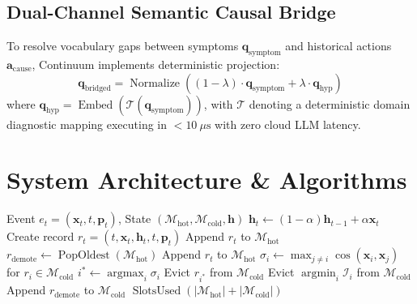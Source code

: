 \documentclass[10pt,journal,compsoc]{IEEEtran}
\begin{document}
\subsection{Dual-Channel Semantic Causal Bridge}
To resolve vocabulary gaps between symptoms $\mathbf{q}_{\text{symptom}}$ and historical actions $\mathbf{a}_{\text{cause}}$, Continuum implements deterministic projection:
\begin{equation}
\mathbf{q}_{\text{bridged}} = \operatorname{Normalize}\left((1 - \lambda) \cdot \mathbf{q}_{\text{symptom}} + \lambda \cdot \mathbf{q}_{\text{hyp}}\right)
\end{equation}
where $\mathbf{q}_{\text{hyp}} = \operatorname{Embed}(\mathcal{T}(\mathbf{q}_{\text{symptom}}))$, with $\mathcal{T}$ denoting a deterministic domain diagnostic mapping executing in $< 10\ \mu\text{s}$ with zero cloud LLM latency.

\section{System Architecture \& Algorithms}

\begin{algorithm}[t]
\caption{Continuous Stream Ingestion with Subspace Diversity Pruning}
\begin{algorithmic}[1]
\REQUIRE Event $e_t = (\mathbf{x}_t, t, \mathbf{p}_t)$, State $(\mathcal{M}_{\text{hot}}, \mathcal{M}_{\text{cold}}, \mathbf{h})$
\STATE $\mathbf{h}_t \leftarrow (1 - \alpha)\mathbf{h}_{t-1} + \alpha \mathbf{x}_t$
\STATE Create record $r_t = (t, \mathbf{x}_t, \mathbf{h}_t, t, \mathbf{p}_t)$
    \STATE Append $r_t$ to $\mathcal{M}_{\text{hot}}$
\ELSE
    \STATE $r_{\text{demote}} \leftarrow \operatorname{PopOldest}(\mathcal{M}_{\text{hot}})$
    \STATE Append $r_t$ to $\mathcal{M}_{\text{hot}}$
        \STATE $\sigma_i \leftarrow \max_{j \ne i} \cos(\mathbf{x}_i, \mathbf{x}_j)$ for $r_i \in \mathcal{M}_{\text{cold}}$
        \STATE $i^* \leftarrow \operatorname{argmax}_i \sigma_i$
            \STATE Evict $r_{i^*}$ from $\mathcal{M}_{\text{cold}}$ 
        \ELSE
            \STATE Evict $\operatorname{argmin}_i \mathcal{I}_i$ from $\mathcal{M}_{\text{cold}}$
        \ENDIF
    \ENDIF
    \STATE Append $r_{\text{demote}}$ to $\mathcal{M}_{\text{cold}}$
\ENDIF
\RETURN $\operatorname{SlotsUsed}(|\mathcal{M}_{\text{hot}}| + |\mathcal{M}_{\text{cold}}|)$
\end{algorithmic}
\end{algorithm}
\end{document}
